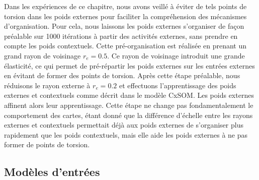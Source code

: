 \documentclass[../main]{subfiles}
\begin{document}
Dans les expériences de ce chapitre, nous avons veillé à éviter de tels points de torsion dans les poids externes pour faciliter la compréhension des mécanismes d'organisation.
Pour cela, nous laissons les poids externes s'organiser de façon préalable sur 1000 itérations à partir des activités externes, sans prendre en compte les poids contextuels. Cette pré-organisation est réalisée en prenant un grand rayon de voisinage $r_e = 0.5$.
Ce rayon de voisinage introduit une grande élasticité, ce qui permet de pré-répartir les poids externes sur les entrées externes en évitant de former des points de torsion. Après cette étape préalable, nous réduisons le rayon externe à $r_e = 0.2$ et effectuons l'apprentissage des poids externes et contextuels comme décrit dans le modèle CxSOM. Les poids externes affinent alors leur apprentissage. Cette étape ne change pas fondamentalement le comportement des cartes, étant donné que la différence d'échelle entre les rayons externes et contextuels permettait déjà aux poids externes de s'organiser plus rapidement que les poids contextuels, mais elle aide les poids externes à ne pas former de points de torsion.


\subsection{Modèles d'entrées}
\end{document}
